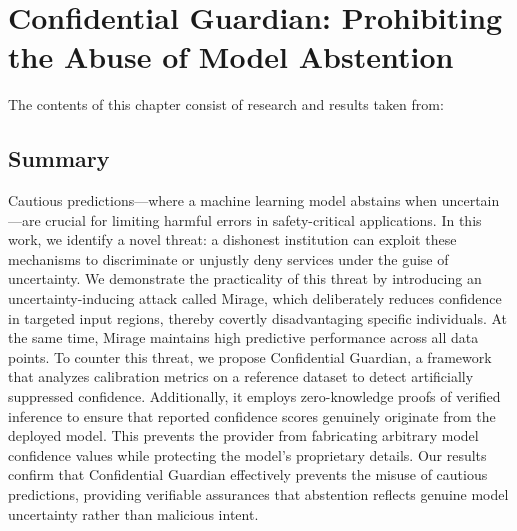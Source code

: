 \newcommand{\myparagraph}[1]{\vspace{1ex}\noindent{\bf #1}}
\def\name{\textit{Confidential Guardian}\xspace}
\def\attack{\textit{Mirage}\xspace}
\def\uncertreg{$\mathcal{X}_\text{unc}$\xspace}
\def\missingnumber{\textcolor{red}{\textbf{XXX}}\xspace}

\newcommand{\prover}{\ensuremath{\mathcal{P}}\xspace}
\newcommand{\verifier}{\ensuremath{\mathcal{V}}\xspace}
\newcommand{\comm}[1]{\ensuremath{\llbracket #1 \rrbracket}}
\newcommand{\relu}{\ensuremath{\texttt{ReLU}}\xspace}


\chapter{Confidential Guardian: Prohibiting the Abuse of Model Abstention}
\label{ch:conf_guard}


\begin{paperref}
\normalfont
The contents of this chapter consist of research and results taken from: \emph{}
\end{paperref}

\section*{Summary}

Cautious predictions---where a machine learning model abstains when uncertain---are crucial for limiting harmful errors in safety-critical applications. In this work, we identify a novel threat: a dishonest institution can exploit these mechanisms to discriminate or unjustly deny services under the guise of uncertainty. We demonstrate the practicality of this threat by introducing an uncertainty-inducing attack called Mirage, which deliberately reduces confidence in targeted input regions, thereby covertly disadvantaging specific individuals. At the same time, Mirage maintains high predictive performance across all data points. To counter this threat, we propose Confidential Guardian, a framework that analyzes calibration metrics on a reference dataset to detect artificially suppressed confidence. Additionally, it employs zero-knowledge proofs of verified inference to ensure that reported confidence scores genuinely originate from the deployed model. This prevents the provider from fabricating arbitrary model confidence values while protecting the model’s proprietary details. Our results confirm that Confidential Guardian effectively prevents the misuse of cautious predictions, providing verifiable assurances that abstention reflects genuine model uncertainty rather than malicious intent.

